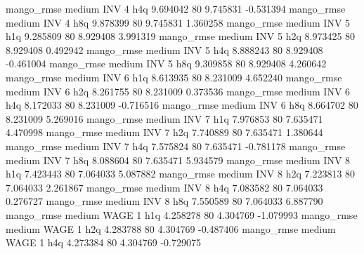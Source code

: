        mango_rmse     medium      INV                 4                  h4q  9.694042 80       9.745831          -0.531394
       mango_rmse     medium      INV                 4                  h8q  9.878399 80       9.745831           1.360258
       mango_rmse     medium      INV                 5                  h1q  9.285809 80       8.929408           3.991319
       mango_rmse     medium      INV                 5                  h2q  8.973425 80       8.929408           0.492942
       mango_rmse     medium      INV                 5                  h4q  8.888243 80       8.929408          -0.461004
       mango_rmse     medium      INV                 5                  h8q  9.309858 80       8.929408           4.260642
       mango_rmse     medium      INV                 6                  h1q  8.613935 80       8.231009           4.652240
       mango_rmse     medium      INV                 6                  h2q  8.261755 80       8.231009           0.373536
       mango_rmse     medium      INV                 6                  h4q  8.172033 80       8.231009          -0.716516
       mango_rmse     medium      INV                 6                  h8q  8.664702 80       8.231009           5.269016
       mango_rmse     medium      INV                 7                  h1q  7.976853 80       7.635471           4.470998
       mango_rmse     medium      INV                 7                  h2q  7.740889 80       7.635471           1.380644
       mango_rmse     medium      INV                 7                  h4q  7.575824 80       7.635471          -0.781178
       mango_rmse     medium      INV                 7                  h8q  8.088604 80       7.635471           5.934579
       mango_rmse     medium      INV                 8                  h1q  7.423443 80       7.064033           5.087882
       mango_rmse     medium      INV                 8                  h2q  7.223813 80       7.064033           2.261867
       mango_rmse     medium      INV                 8                  h4q  7.083582 80       7.064033           0.276727
       mango_rmse     medium      INV                 8                  h8q  7.550589 80       7.064033           6.887790
       mango_rmse     medium     WAGE                 1                  h1q  4.258278 80       4.304769          -1.079993
       mango_rmse     medium     WAGE                 1                  h2q  4.283788 80       4.304769          -0.487406
       mango_rmse     medium     WAGE                 1                  h4q  4.273384 80       4.304769          -0.729075
